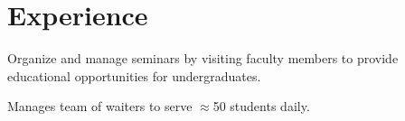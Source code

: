 \documentclass[letterpaper]{deedy-resume} %
\begin{document}
\begin{minipage}[t]{0.58\textwidth} %


\section{Experience}

\vspace{\topsep}
\begin{tightitemize}
\item Organize and manage seminars by visiting faculty members to provide educational opportunities for undergraduates.
\end{tightitemize}

\sectionspace

\vspace{\topsep}
\begin{tightitemize}
\item Manages team of waiters to serve $\approx$50 students daily.
\end{tightitemize}

\sectionspace









\end{minipage}
\end{document}
